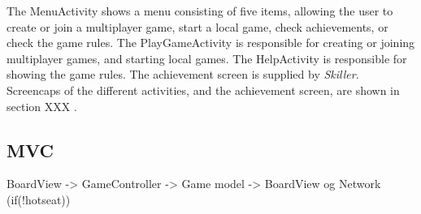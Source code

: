 The MenuActivity shows a menu consisting of five items, allowing the user to create or join a multiplayer game, start a local game, check achievements, or check the game rules. The PlayGameActivity is responsible for creating or joining multiplayer games, and starting local games. The HelpActivity is responsible for showing the game rules. The achievement screen is supplied by \emph{Skiller}.\\

Screencaps of the different activities, and the achievement screen, are shown in section XXX .

\subsection{MVC}
BoardView -> GameController -> Game model -> BoardView og Network (if(!hotseat))






